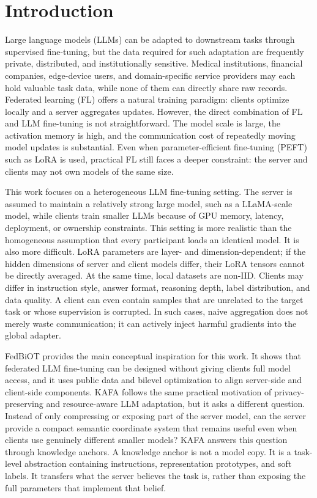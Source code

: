 \documentclass[conference]{IEEEtran}
\begin{document}
\section{Introduction}
Large language models (LLMs) can be adapted to downstream tasks through supervised fine-tuning, but the data required for such adaptation are frequently private, distributed, and institutionally sensitive. Medical institutions, financial companies, edge-device users, and domain-specific service providers may each hold valuable task data, while none of them can directly share raw records. Federated learning (FL) offers a natural training paradigm: clients optimize locally and a server aggregates updates. However, the direct combination of FL and LLM fine-tuning is not straightforward. The model scale is large, the activation memory is high, and the communication cost of repeatedly moving model updates is substantial. Even when parameter-efficient fine-tuning (PEFT) such as LoRA is used, practical FL still faces a deeper constraint: the server and clients may not own models of the same size.

This work focuses on a heterogeneous LLM fine-tuning setting. The server is assumed to maintain a relatively strong large model, such as a LLaMA-scale model, while clients train smaller LLMs because of GPU memory, latency, deployment, or ownership constraints. This setting is more realistic than the homogeneous assumption that every participant loads an identical model. It is also more difficult. LoRA parameters are layer- and dimension-dependent; if the hidden dimensions of server and client models differ, their LoRA tensors cannot be directly averaged. At the same time, local datasets are non-IID. Clients may differ in instruction style, answer format, reasoning depth, label distribution, and data quality. A client can even contain samples that are unrelated to the target task or whose supervision is corrupted. In such cases, naive aggregation does not merely waste communication; it can actively inject harmful gradients into the global adapter.

FedBiOT provides the main conceptual inspiration for this work. It shows that federated LLM fine-tuning can be designed without giving clients full model access, and it uses public data and bilevel optimization to align server-side and client-side components. KAFA follows the same practical motivation of privacy-preserving and resource-aware LLM adaptation, but it asks a different question. Instead of only compressing or exposing part of the server model, can the server provide a compact semantic coordinate system that remains useful even when clients use genuinely different smaller models? KAFA answers this question through knowledge anchors. A knowledge anchor is not a model copy. It is a task-level abstraction containing instructions, representation prototypes, and soft labels. It transfers what the server believes the task is, rather than exposing the full parameters that implement that belief.
\end{document}
